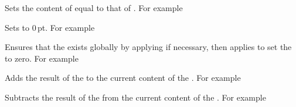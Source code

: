\documentclass[oneside]{book}
\begin{document}
\begin{function}{\dimSetEq}
\begin{syntax}
  
\end{syntax}
Sets the content of  equal to that of
. For example
\begin{demohigh}
\dimSet \lTmpaDim {10pt}
\dimSetEq \lTmpbDim \lTmpaDim
\dimUse \lTmpbDim
\end{demohigh}
\end{function}

\begin{function}{\dimZero}
\begin{syntax}
 
\end{syntax}
Sets  to $0$\,pt. For example
\begin{demohigh}
\dimSet \lTmpaDim {1em}
\dimZero \lTmpaDim
\dimUse \lTmpaDim
\end{demohigh}
\end{function}

\begin{function}{\dimZeroNew}
\begin{syntax}
 
\end{syntax}
Ensures that the  exists globally by applying
 if necessary, then applies
 to set the  to zero. For example
\begin{demohigh}
\dimZeroNew \lFooSomeDim
\dimUse \lFooSomeDim
\end{demohigh}
\end{function}

\begin{function}{\dimAdd}
\begin{syntax}
  
\end{syntax}
Adds the result of the  to the current
content of the . For example
\begin{demohigh}
\dimSet \lTmpaDim {5.3pt}
\dimAdd \lTmpaDim {2.11pt}
\dimUse \lTmpaDim
\end{demohigh}
\end{function}

\begin{function}{\dimSub}
\begin{syntax}
  
\end{syntax}
Subtracts the result of the  from the
current content of the . For example
\begin{demohigh}
\dimSet \lTmpaDim {5.3pt}
\dimSub \lTmpaDim {2.11pt}
\dimUse \lTmpaDim
\end{demohigh}
\end{function}
\end{document}
